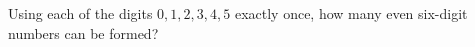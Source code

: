 Using each of the digits $0,1,2,3,4,5$ exactly once, how many even six-digit numbers can be formed?
